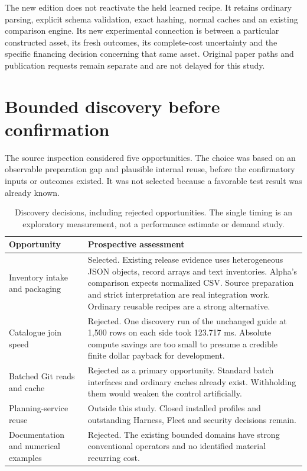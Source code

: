 \documentclass[11pt,a4paper]{article}
\begin{document}
The new edition does not reactivate the held learned recipe. It retains ordinary
parsing, explicit schema validation, exact hashing, normal caches and an existing
comparison engine. Its new experimental connection is between a particular
constructed asset, its fresh outcomes, its complete-cost uncertainty and the
specific financing decision concerning that same asset. Original paper paths and
publication requests remain separate and are not delayed for this study.

\section{Bounded discovery before confirmation}
The source inspection considered five opportunities. The choice was based on an
observable preparation gap and plausible internal reuse, before the confirmatory
inputs or outcomes existed. It was not selected because a favorable test result
was already known.

\begin{table}[ht]\small\centering
\begin{tabularx}{\linewidth}{@{}>{\raggedright\arraybackslash}p{.25\linewidth}X@{}}\toprule
Opportunity & Prospective assessment\\\midrule
Inventory intake and packaging & Selected. Existing release evidence uses
heterogeneous JSON objects, record arrays and text inventories. Alpha's comparison
expects normalized CSV. Source preparation and strict interpretation are real
integration work. Ordinary reusable recipes are a strong alternative.\\
Catalogue join speed & Rejected. One discovery run of the unchanged guide at
1,500 rows on each side took 123.717 ms. Absolute compute savings are too small
to presume a credible finite dollar payback for development.\\
Batched Git reads and cache & Rejected as a primary opportunity. Standard batch
interfaces and ordinary caches already exist. Withholding them would weaken the
control artificially.\\
Planning-service reuse & Outside this study. Closed installed profiles and
outstanding Harness, Fleet and security decisions remain.\\
Documentation and numerical examples & Rejected. The existing bounded domains
have strong conventional operators and no identified material recurring cost.\\\bottomrule
\end{tabularx}
\caption{Discovery decisions, including rejected opportunities. The single timing
is an exploratory measurement, not a performance estimate or demand study.}
\end{table}
\end{document}
